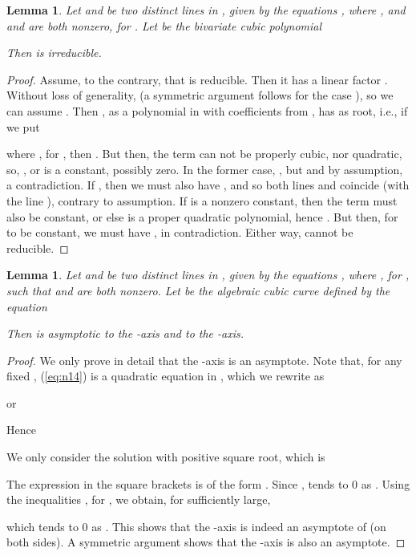 \documentclass[12pt]{article}
\newtheorem{lemma}[theorem]{Lemma}
\begin{document}
\begin{lemma} \label{lem:irr1_n}
Let  and  be two distinct lines in
, given by the equations , where
,
and  and  are both nonzero, for .
Let  be the bivariate cubic polynomial

Then  is irreducible.
\end{lemma}
\begin{proof}
Assume, to the contrary, that  is reducible. Then it has a
linear factor . Without loss of generality,
 (a symmetric
argument follows for the case ), so we can assume .
Then , as a polynomial in  with coefficients from ,
has  as root, i.e., if we put

where , for ,
then . But then, the term  can not be
properly cubic, nor quadratic, so, , or  is a
constant, possibly zero. In the former case, , but
 and  by assumption,
a contradiction.
If , then we
must also have , and so both lines  and
 coincide (with the line ), contrary to assumption.
If  is a nonzero constant, then the term  must also
be constant, or else  is a proper quadratic polynomial,
hence . But then, for 
to be constant, we must have , in contradiction.
Either way,  cannot be reducible.
\end{proof}

\begin{lemma} \label{lem:as_n}
Let  and  be two distinct lines in ,
given by the equations , where
, for ,
such that  and  are both nonzero.
Let  be the algebraic cubic curve defined by the equation

Then  is asymptotic to the -axis and to the -axis.
\end{lemma}
\begin{proof}
We only prove in detail that the -axis is an asymptote. Note
that, for any fixed , (\ref{eq:n14}) is a quadratic
equation in , which we rewrite as

or

Hence

We only consider the solution with positive square root, which is

The expression in the square brackets is of the form
. Since ,  tends to 0 as . Using the inequalities
,
for , we obtain, for  sufficiently large,

which tends to 0 as . This shows that the
-axis is indeed an asymptote of  (on both sides).
A symmetric argument shows that the -axis is also an
asymptote.
\end{proof}
\end{document}
